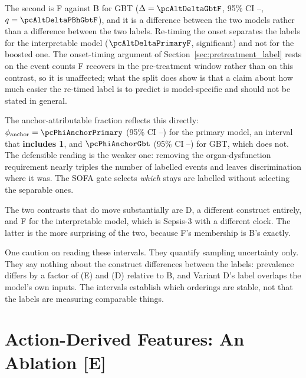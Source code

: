 The second is F against B for GBT ($\Delta = \pcAltDeltaGbtF$,
95\% CI \pcAltDeltaCiLoGbtF--\pcAltDeltaCiHiGbtF,
$q = \pcAltDeltaPBhGbtF$), and it is a difference between the two models rather
than a difference between the two labels. Re-timing the onset separates the
labels for the interpretable model ($\pcAltDeltaPrimaryF$, significant) and not
for the boosted one. The onset-timing argument of
Section~\ref{sec:pretreatment_label} rests on the event counts F recovers in
the pre-treatment window rather than on this contrast, so it is unaffected;
what the split does show is that a claim about how much easier the re-timed
label is to predict is model-specific and should not be stated in general.

The anchor-attributable fraction reflects this directly:
$\phi_{\text{anchor}} = \pcPhiAnchorPrimary$ (95\% CI
\pcPhiAnchorCiLoPrimary--\pcPhiAnchorCiHiPrimary) for the primary model, an
interval that \textbf{includes 1}, and $\pcPhiAnchorGbt$ (95\% CI
\pcPhiAnchorCiLoGbt--\pcPhiAnchorCiHiGbt) for GBT, which does not. The
defensible reading is the weaker one: removing the organ-dysfunction
requirement nearly triples the number of labelled events and leaves
discrimination where it was. The SOFA gate selects \emph{which} stays are
labelled without selecting the separable ones.

The two contrasts that do move substantially are D, a different construct
entirely, and F for the interpretable model, which is Sepsis-3 with a different
clock. The latter is the more surprising of the two, because F's membership is
B's exactly.

One caution on reading these intervals. They quantify sampling uncertainty
only. They say nothing about the construct differences between the labels:
prevalence differs by a factor of \pcAltEventRatioPrimaryE{} (E) and
\pcAltEventRatioPrimaryD{} (D) relative to B, and Variant D's label overlaps
the model's own inputs. The intervals establish which orderings are stable, not
that the labels are measuring comparable things.




\section{Action-Derived Features: An Ablation \texorpdfstring{[E]}{[E]}}
\label{sec:ablation}

